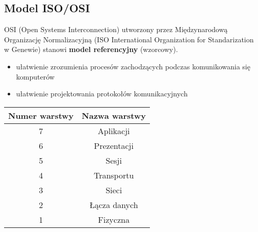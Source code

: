 \documentclass[../main.tex]{subfiles}
\begin{document}
    \subsection{Model ISO/OSI}
    OSI (Open Systems Interconnection) utworzony przez Międzynarodową Organizację
    Normalizacyjną (ISO International Organization for Standarization w Genewie)
    stanowi \textbf{model referencyjny} (wzorcowy).

    \begin{itemize}
        \item ułatwienie zrozumienia procesów zachodzących podczas komunikowania się komputerów
        \item ułatwienie projektowania protokołów komunikacyjnych
    \end{itemize}

    \begin{tabular}{|c|c|}
        \hline
        \textbf{Numer warstwy} & \textbf{Nazwa warstwy}\\
        \hline
        7 & Aplikacji\\
        \hline
        6 & Prezentacji\\
        \hline
        5 & Sesji\\
        \hline
        4 & Transportu\\
        \hline
        3 & Sieci\\
        \hline
        2 & Łącza danych\\
        \hline
        1 & Fizyczna\\
        \hline
    \end{tabular}
\end{document}
